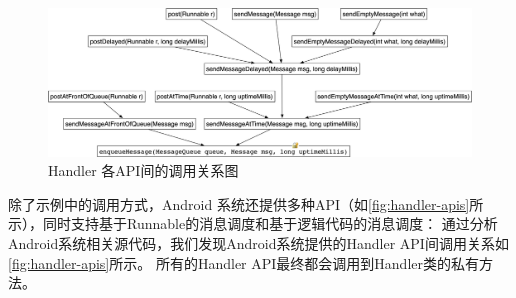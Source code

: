 


\begin{figure}[hb]
	\centering
	\includegraphics[width=\textwidth]{./Figures/Handler-apis.png}
	\caption{ Handler 各API间的调用关系图}
	\label{fig:handler-apis}
\end{figure}


除了示例中的调用方式，Android 系统还提供多种API\cite{HandlerA26:online}（如\autoref{fig:handler-apis}所示），同时支持基于{Runnable}的消息调度和基于逻辑代码的消息调度：
 通过分析Android系统相关源代码，我们发现Android系统提供的Handler API间调用关系如\autoref{fig:handler-apis}所示。
 所有的Handler API最终都会调用到Handler类的私有方法。


